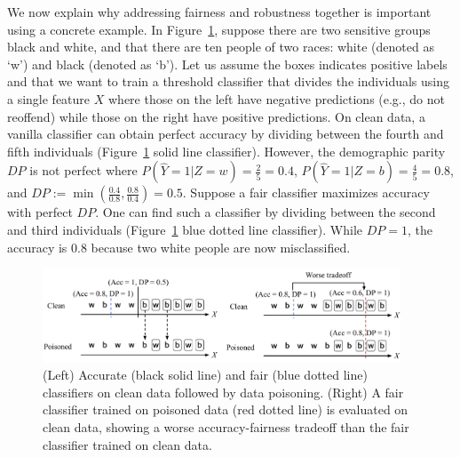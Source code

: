 \documentclass[11pt]{article}
\begin{document}
We now explain why addressing fairness and robustness together is important using a concrete example. In Figure~\ref{fig:tradeoff}, suppose there are two sensitive groups black and white, and that there are ten people of two races: white (denoted as `w') and black (denoted as `b'). Let us assume the boxes indicates positive labels and that we want to train a threshold classifier that divides the individuals using a single feature $X$ where those on the left have negative predictions (e.g., do not reoffend) while those on the right have positive predictions. On clean data, a vanilla classifier can obtain perfect accuracy by dividing between the fourth and fifth individuals (Figure~\ref{fig:tradeoff} solid line classifier). However, the demographic parity $DP$ is not perfect where $P(\hat{Y}=1|Z=w) = \frac{2}{5} = 0.4$, $P(\hat{Y}=1|Z=b) = \frac{4}{5} = 0.8$, and $DP := \min \left( \frac{0.4}{0.8}, \frac{0.8}{0.4} \right) = 0.5$. Suppose a fair classifier maximizes accuracy with perfect $DP$. One can find such a classifier by dividing between the second and third individuals (Figure~\ref{fig:tradeoff} blue dotted line classifier). While $DP = 1$, the accuracy is 0.8 because two white people are now misclassified. 

\begin{figure}[t]
		\centering
		\includegraphics[width=0.95\textwidth]{submissions/responsible-ai/figs/tradeoff-crop.pdf}
   \caption{(Left) Accurate (black solid line) and fair (blue dotted line) classifiers on clean data followed by data poisoning. (Right) A fair classifier trained on poisoned data (red dotted line) is evaluated on clean data, showing a worse accuracy-fairness tradeoff than the fair classifier trained on clean data.}
   \label{fig:tradeoff}
\end{figure}
\end{document}
